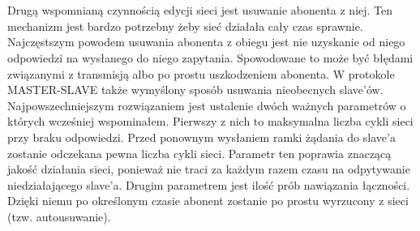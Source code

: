 		\\
		\\
		Drugą wspomnianą czynnością edycji sieci jest usuwanie abonenta z niej. Ten mechanizm jest bardzo potrzebny żeby sieć działała cały czas sprawnie. Najczęstszym powodem usuwania abonenta z obiegu jest nie uzyskanie od niego odpowiedzi na wysłanego do niego zapytania. Spowodowane to może być błędami związanymi z transmisją albo po prostu uszkodzeniem abonenta. W protokole MASTER-SLAVE także wymyślony sposób usuwania nieobecnych slave'ów. Najpowszechniejszym rozwiązaniem jest ustalenie dwóch ważnych parametrów o których wcześniej wspominałem. Pierwszy z nich  to maksymalna liczba cykli sieci przy braku odpowiedzi. Przed ponownym wysłaniem ramki żądania do slave'a zostanie odczekana pewna liczba cykli sieci. Parametr ten poprawia znaczącą jakość działania sieci, ponieważ nie traci za każdym razem czasu na odpytywanie niedziałającego slave'a. Drugim parametrem jest ilość prób nawiązania łączności. Dzięki niemu po określonym czasie abonent zostanie po prostu wyrzucony z sieci (tzw. autousuwanie).
